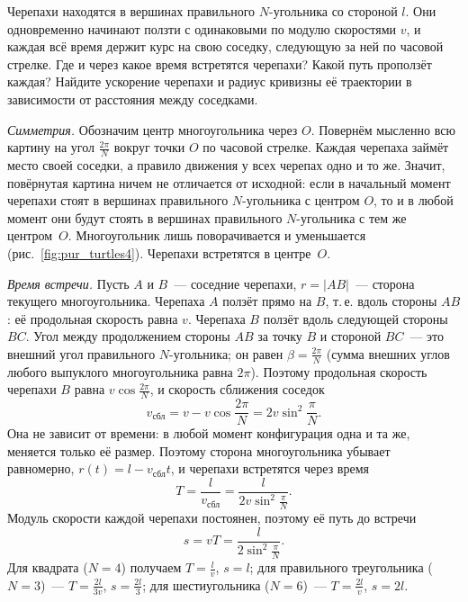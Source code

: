 \documentclass[../main.tex]{subfiles}
\begin{document}
\begin{example}
Черепахи находятся в вершинах правильного $N$-угольника со стороной $l$. Они
одновременно начинают ползти с одинаковыми по модулю скоростями $v$, и каждая всё
время держит курс на свою соседку, следующую за ней по часовой стрелке. Где и через
какое время встретятся черепахи? Какой путь проползёт каждая? Найдите ускорение
черепахи и радиус кривизны её траектории в зависимости от расстояния между
соседками.


\noindent\textit{Симметрия.} Обозначим центр многоугольника через $O$. Повернём
мысленно всю картину на угол $\frac{2\pi}{N}$ вокруг точки $O$ по часовой стрелке.
Каждая черепаха займёт место своей соседки, а правило движения у всех черепах одно
и то же. Значит, повёрнутая картина ничем не отличается от исходной: если в начальный
момент черепахи стоят в вершинах правильного $N$-угольника с центром $O$, то и в
любой момент они будут стоять в вершинах правильного $N$-угольника с тем же
центром~$O$. Многоугольник лишь поворачивается и уменьшается
(рис.~\ref{fig:pur_turtles4}). Черепахи встретятся в центре~$O$.

\noindent\textit{Время встречи.} Пусть $A$ и $B$~--- соседние черепахи, $r = |AB|$~---
сторона текущего многоугольника. Черепаха $A$ ползёт прямо на $B$, т.\,е. вдоль
стороны $AB$: её продольная скорость равна $v$. Черепаха $B$ ползёт вдоль следующей
стороны $BC$. Угол между продолжением стороны $AB$ за точку $B$ и стороной $BC$~---
это внешний угол правильного $N$-угольника; он равен $\beta = \frac{2\pi}{N}$
(сумма внешних углов любого выпуклого многоугольника равна $2\pi$). Поэтому
продольная скорость черепахи $B$ равна $v\cos\frac{2\pi}{N}$, и скорость сближения
соседок
\[
v_{\text{сбл}} = v - v\cos\frac{2\pi}{N} = 2v\sin^2\frac{\pi}{N}.
\]
Она не зависит от времени: в любой момент конфигурация одна и та же, меняется только
её размер. Поэтому сторона многоугольника убывает равномерно,
$r(t) = l - v_{\text{сбл}}t$, и черепахи встретятся через время
\[
T = \frac{l}{v_{\text{сбл}}} = \frac{l}{2v\sin^2\frac{\pi}{N}}.
\]
Модуль скорости каждой черепахи постоянен, поэтому её путь до встречи
\[
s = vT = \frac{l}{2\sin^2\frac{\pi}{N}}.
\]
Для квадрата ($N = 4$) получаем $T = \frac{l}{v}$, $s = l$; для правильного
треугольника ($N = 3$)~--- $T = \frac{2l}{3v}$, $s = \frac{2l}{3}$; для шестиугольника
($N = 6$)~--- $T = \frac{2l}{v}$, $s = 2l$.


\end{example}
\end{document}
